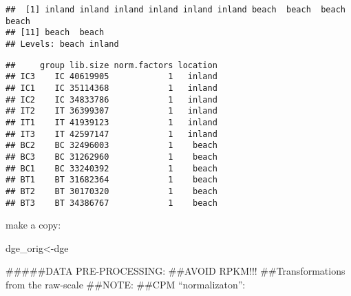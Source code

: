 \documentclass[
]{article}
\newenvironment{Shaded}{\begin{snugshade}}{\end{snugshade}}
\newcommand{\CommentTok}[1]{\textcolor[rgb]{0.56,0.35,0.01}{\textit{#1}}}
\newcommand{\DataTypeTok}[1]{\textcolor[rgb]{0.13,0.29,0.53}{#1}}
\newcommand{\FloatTok}[1]{\textcolor[rgb]{0.00,0.00,0.81}{#1}}
\newcommand{\KeywordTok}[1]{\textcolor[rgb]{0.13,0.29,0.53}{\textbf{#1}}}
\newcommand{\NormalTok}[1]{#1}
\newcommand{\OperatorTok}[1]{\textcolor[rgb]{0.81,0.36,0.00}{\textbf{#1}}}
\newcommand{\OtherTok}[1]{\textcolor[rgb]{0.56,0.35,0.01}{#1}}
\newcommand{\StringTok}[1]{\textcolor[rgb]{0.31,0.60,0.02}{#1}}
\begin{document}
\begin{verbatim}
##  [1] inland inland inland inland inland inland beach  beach  beach  beach 
## [11] beach  beach 
## Levels: beach inland
\end{verbatim}

\begin{Shaded}
\end{Shaded}

\begin{verbatim}
##     group lib.size norm.factors location
## IC3    IC 40619905            1   inland
## IC1    IC 35114368            1   inland
## IC2    IC 34833786            1   inland
## IT2    IT 36399307            1   inland
## IT1    IT 41939123            1   inland
## IT3    IT 42597147            1   inland
## BC2    BC 32496003            1    beach
## BC3    BC 31262960            1    beach
## BC1    BC 33240392            1    beach
## BT1    BT 31682364            1    beach
## BT2    BT 30170320            1    beach
## BT3    BT 34386767            1    beach
\end{verbatim}

make a copy:

\begin{Shaded}
\begin{Highlighting}[]
\NormalTok{dge_orig<-dge}
\end{Highlighting}
\end{Shaded}

\#\#\#\#\#DATA PRE-PROCESSING: \#\#AVOID RPKM!!! \#\#Transformations
from the raw-scale \#\#NOTE: \#\#CPM ``normalizaton'':

\begin{Shaded}
\end{Shaded}
\end{document}
